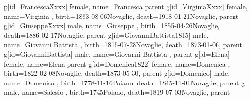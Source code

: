 \documentclass{article}
\begin{document}
\begin{midpage}
\begin{center}
\begin{genealogypicture}
{{{{{{{{                            }
                            p[id=FrancescaXxxx]{
                                female,
                                name={Francesca}
                            }
                        }
                    }
                }
            }
            parent{
                g[id=VirginiaXxxx]{
                    female,
                    name={Virginia },
                    birth={1883-08-06}{Novaglie},
                    death={1918-01-21}{Novaglie},
                }
                parent{
                    g[id=GiuseppeXxxx]{
                        male,
                        name={Giuseppe },
                        birth={1855-04-26}{Novaglie},
                        death={1886-02-17}{Novaglie},
                    }
                    parent{
                        g[id=GiovanniBattista1815]{
                            male,
                            name={Giovanni Battista },
                            birth={1815-07-28}{Novaglie},
                            death={1873-01-06}{},
                        }
                        parent{
                            g[id=GiovanniBattista]{
                                male,
                                name={Giovanni Battista },
                            }
                        }
                        parent{
                            g[id=Elena]{
                                female,
                                name={Elena }
                            }
                        }
                    }
                    parent{
                        g[id=Domenica1822]{
                            female,
                            name={Domenica },
                            birth={1822-02-08}{Novaglie},
                            death={1873-05-30}{},
                        }
                        parent{
                            g[id=Domenico]{
                                male,
                                name={Domenico },
                                birth={1778-11-16}{Poiano},
                                death={1845-11-01}{Novaglie},
                            }
                            parent{
                                g{
                                    male,
                                    name={Salesio },
                                    birth={1745}{Poiano},
                                    death={1819-07-03}{Novaglie},
                                }
                                parent{
}}}}}}}}}
\end{genealogypicture}
\end{center}
\end{midpage}
\end{document}
